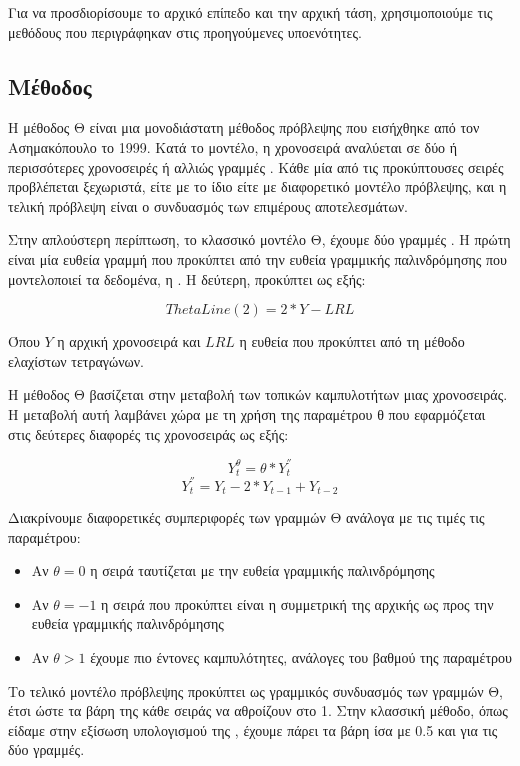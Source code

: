 Για να προσδιορίσουμε το αρχικό επίπεδο και την αρχική τάση, χρησιμοποιούμε τις μεθόδους που περιγράφηκαν στις προηγούμενες υποενότητες.


\subsection{Μέθοδος }

Η μέθοδος Θ είναι μια μονοδιάστατη μέθοδος πρόβλεψης που εισήχθηκε από τον Ασημακόπουλο το 1999. Κατά το μοντέλο, η χρονοσειρά αναλύεται σε δύο ή περισσότερες χρονοσειρές ή αλλιώς γραμμές . Κάθε μία από τις προκύπτουσες σειρές προβλέπεται ξεχωριστά, είτε με το ίδιο είτε με διαφορετικό μοντέλο πρόβλεψης, και η τελική πρόβλεψη είναι ο συνδυασμός των επιμέρους αποτελεσμάτων. 

Στην απλούστερη περίπτωση, το κλασσικό μοντέλο Θ, έχουμε δύο γραμμές . Η πρώτη είναι μία ευθεία γραμμή που προκύπτει από την ευθεία γραμμικής παλινδρόμησης που μοντελοποιεί τα δεδομένα, η . Η δεύτερη,  προκύπτει ως εξής:

\[ ThetaLine(2) = 2*Y - LRL\]

Όπου $Y$ η αρχική χρονοσειρά και $LRL$ η ευθεία που προκύπτει από τη μέθοδο ελαχίστων τετραγώνων. 

Η μέθοδος Θ βασίζεται στην μεταβολή των τοπικών καμπυλοτήτων μιας χρονοσειράς. Η μεταβολή αυτή λαμβάνει χώρα με τη χρήση της παραμέτρου θ που εφαρμόζεται στις δεύτερες διαφορές τις χρονοσειράς ως εξής: 

\[ Y_t^\theta = \theta*Y_t^{''} \]
\[ Y_t^{''} = Y_t - 2*Y_{t-1} + Y_{t-2} \]

Διακρίνουμε διαφορετικές συμπεριφορές των γραμμών Θ ανάλογα με τις τιμές τις παραμέτρου:
\begin{itemize}
    \item Αν $\theta=0$ η σειρά ταυτίζεται με την ευθεία γραμμικής παλινδρόμησης
    \item Αν $\theta=-1$ η σειρά που προκύπτει είναι η συμμετρική της αρχικής ως προς την ευθεία γραμμικής παλινδρόμησης
    \item Αν $\theta>1$ έχουμε πιο έντονες καμπυλότητες, ανάλογες του βαθμού της παραμέτρου
\end{itemize}

Το τελικό μοντέλο πρόβλεψης προκύπτει ως γραμμικός συνδυασμός των γραμμών Θ, έτσι ώστε τα βάρη της κάθε σειράς να αθροίζουν στο 1. Στην κλασσική μέθοδο, όπως είδαμε στην εξίσωση υπολογισμού της , έχουμε πάρει τα βάρη ίσα με 0.5 και για τις δύο γραμμές.

